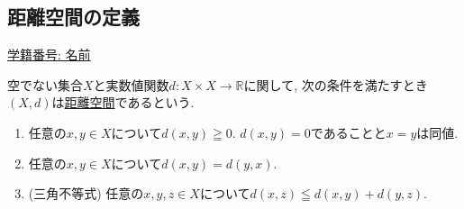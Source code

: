 \documentclass[dvipdfmx,a4paper,11pt]{article}
\newcommand{\R}{\mathbb{R}}
\theoremstyle{definition}
\begin{document}
 \newpage
 
 \begin{center}
\section{距離空間の定義}
\label{sec-11}
\end{center}

   \begin{flushleft}
{ \large \underline{学籍番号: \hspace{4cm} 名前  \hspace{8.5cm}}}
{\footnotesize }
\end{flushleft}


 \begin{tcolorbox}[
    colback = white,
    colframe = black!35!black,
    fonttitle = \bfseries,
    breakable = true]
    空でない集合$X$と実数値関数$d : X \times X \rightarrow \R$に関して, 次の条件を満たすとき$(X,d)$は\underline{距離空間}であるという.
    \begin{enumerate}
    \setlength{\parskip}{0cm} 
  \setlength{\itemsep}{0cm} 
    \item 任意の$x,y \in X$について$d(x,y) \geqq 0$. $d(x,y)=0$であることと$x=y$は同値. 
    \item 任意の$x,y \in X$について$d(x,y)=d(y,x)$.
    \item (三角不等式) 任意の$x,y,z \in X$について$d(x,z) \leqq d(x,y) + d(y,z)$. 
    \end{enumerate}
 \end{tcolorbox}
 
\end{document}
